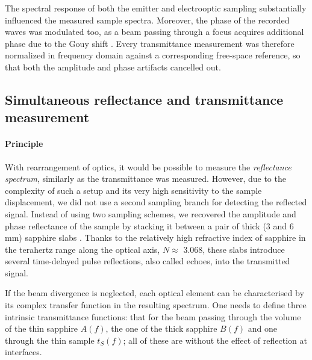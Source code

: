
The spectral response of both the emitter and electrooptic sampling substantially influenced the measured sample spectra. Moreover, the phase of the recorded waves was modulated too, as a beam passing through a focus acquires additional phase due to the Gouy shift \cite{kuzel2010gouy}. Every transmittance measurement was therefore normalized in frequency domain against a corresponding free-space reference, so that both the amplitude and phase artifacts cancelled out. 


\subsection{Simultaneous reflectance and transmittance measurement}
\paragraph{Principle} %
\label{srtm}
With rearrangement of optics, it would be possible to measure the \textit{reflectance spectrum}, similarly as the transmittance was measured. However, due to the complexity of such a setup and its very high sensitivity to the sample displacement, we did not use a second sampling branch for detecting the reflected signal. Instead of using two sampling schemes, we recovered the amplitude and phase reflectance of the sample by stacking it between a pair of thick (3 and 6 mm) sapphire slabs \cite{nemec2012resonant}. Thanks to the relatively high refractive index of sapphire in the terahertz range along the optical axis, $N \approx$ 3.068, these slabs introduce several time-delayed pulse reflections, also called echoes, into the transmitted signal.

If the beam divergence is neglected, each optical element can be characterised by its complex transfer function in the resulting spectrum. One needs to define three intrinsic transmittance functions: that for the beam passing through the volume of the thin sapphire $A(f)$, the one of the thick sapphire $B(f)$ and one through the thin sample $t_S(f)$; all of these are without the effect of reflection at interfaces. 

